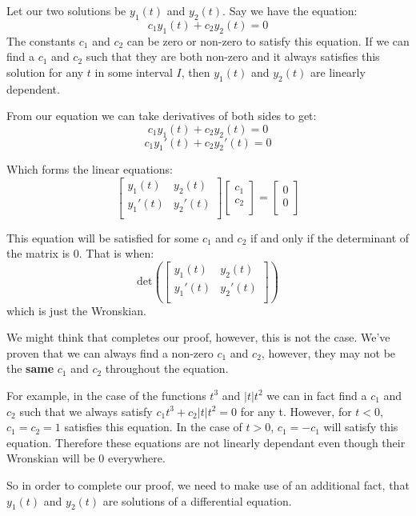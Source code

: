 \documentclass{report}
\begin{document}
Let our two solutions be $y_1(t)$ and $y_2(t)$. Say we have the equation:
$$c_1y_1(t) +c_2y_2(t) = 0$$
The constants $c_1$ and $c_2$ can be zero or non-zero to satisfy this equation. If we can find a $c_1$ and $c_2$ such that they are both non-zero and it always satisfies this solution for any $t$ in some interval $I$, then $y_1(t)$ and $y_2(t)$ are linearly dependent.

From our equation we can take derivatives of both sides to get:
$$c_1y_1(t) +c_2y_2(t) = 0$$
$$c_1y_1'(t) +c_2y_2'(t) = 0$$

Which forms the linear equations:
$$
\begin{bmatrix}
    y_1(t) & y_2(t) \\
    y_1'(t) & y_2'(t) \\
\end{bmatrix}
\begin{bmatrix}
    c_1 \\
    c_2 \\
\end{bmatrix}
=
\begin{bmatrix}
    0 \\
    0 \\
\end{bmatrix}
$$

This equation will be satisfied for some $c_1$ and $c_2$ if and only if the determinant of the matrix is 0. That is when:
$$
\text{det}\left(\begin{bmatrix}
        y_1(t) & y_2(t) \\
        y_1'(t) & y_2'(t) \\
        \end{bmatrix}\right)
$$
which is just the Wronskian.

We might think that completes our proof, however, this is not the case. We've proven that we can always find a non-zero $c_1$ and $c_2$, however, they may not be the \textbf{same} $c_1$ and $c_2$ throughout the equation. 

For example, in the case of the functions $t^3$ and $|t|t^2$ we can in fact find a $c_1$ and $c_2$ such that we always satisfy $c_1t^3+c_2|t|t^2=0$ for any t. However, for $t < 0$, $c_1=c_2=1$ satisfies this equation. In the case of $t>0$, $c_1=-c_1$ will satisfy this equation. Therefore these equations are not linearly dependant even though their Wronskian will be 0 everywhere.

So in order to complete our proof, we need to make use of an additional fact, that $y_1(t)$ and $y_2(t)$ are solutions of a differential equation. 
\end{document}
